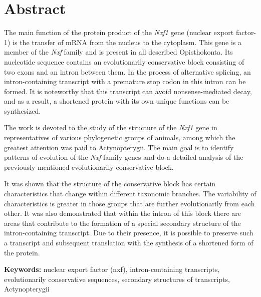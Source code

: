 \clearpage
\section*{Abstract}

The main function of the protein product of the \textit{Nxf1} gene (nuclear export factor-1) is the transfer of mRNA from the nucleus to the cytoplasm. This gene is a member of the \textit{Nxf} family and is present in all described Opisthokonta. Its nucleotide sequence contains an evolutionarily conservative block consisting of two exons and an intron between them. In the process of alternative splicing, an intron-containing transcript with a premature stop codon in this intron can be formed. It is noteworthy that this transcript can avoid nonsense-mediated decay, and as a result, a shortened protein with its own unique functions can be synthesized.

The work is devoted to the study of the structure of the \textit{Nxf1} gene in representatives of various phylogenetic groups of animals, among which the greatest attention was paid to Actynopterygii. The main goal is to identify patterns of evolution of the \textit{Nxf} family genes and do a detailed analysis of the previously mentioned evolutionarily conservative block.

It was shown that the structure of the conservative block has certain characteristics that change within different taxonomic branches. The variability of characteristics is greater in those groups that are further evolutionarily from each other. It was also demonstrated that within the intron of this block there are areas that contribute to the formation of a special secondary structure of the intron-containing transcript. Due to their presence, it is possible to preserve such a transcript and subsequent translation with the synthesis of a shortened form of the protein.

\vspace{1em}

\textbf{Keywords:} nuclear export factor (nxf), intron-containing transcripts, evolutionarily conservative sequences, secondary structures of transcripts, Actynopterygii